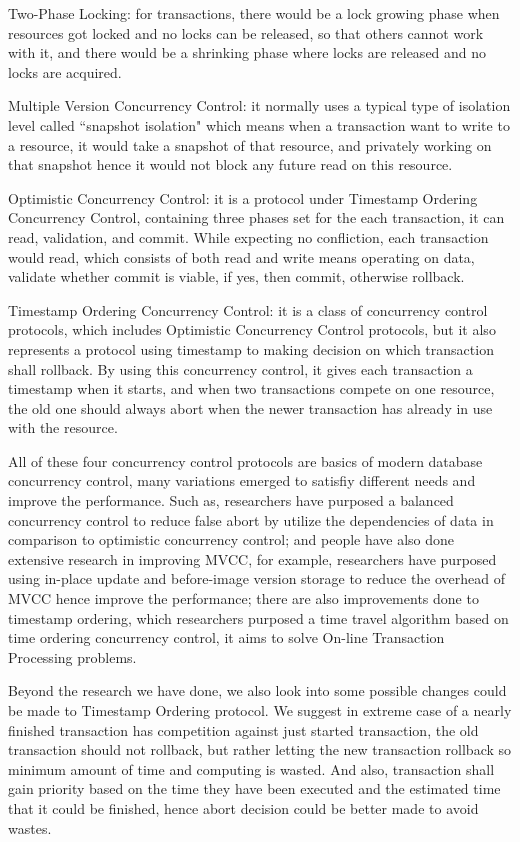 Two-Phase Locking: for transactions, there would be a lock growing phase when resources got locked and no locks can be released, so that others cannot work with it, and there would be a shrinking phase where locks are released and no locks are acquired.

Multiple Version Concurrency Control: it normally uses a typical type of isolation level called ``snapshot isolation" which means when a transaction want to write to a resource, it would take a snapshot of that resource, and privately working on that snapshot hence it would not block any future read on this resource\cite{berenson1995critique}.

Optimistic Concurrency Control: it is a protocol under Timestamp Ordering Concurrency Control, containing three phases set for the each transaction, it can read, validation, and commit. While expecting no confliction, each transaction would read, which consists of both read and write means operating on data, validate whether commit is viable, if yes, then commit, otherwise rollback.

Timestamp Ordering Concurrency Control: it is a class of concurrency control protocols, which includes Optimistic Concurrency Control protocols, but it also represents a protocol using timestamp to making decision on which transaction shall rollback. By using this concurrency control, it gives each transaction a timestamp when it starts, and when two transactions compete on one resource, the old one should always abort when the newer transaction has already in use with the resource.

All of these four concurrency control protocols are basics of modern database concurrency control, many variations emerged to satisfiy different needs and improve the performance. Such as, researchers have purposed a balanced concurrency control to reduce false abort by utilize the dependencies of data in comparison to optimistic concurrency control\cite{yuan2016bcc}; and people have also done extensive research in improving MVCC, for example, researchers have purposed using in-place update and before-image version storage to reduce the overhead of MVCC hence improve the performance\cite{neumann2015fast}; there are also improvements done to timestamp ordering, which researchers purposed a time travel algorithm based on time ordering concurrency control, it aims to solve On-line Transaction Processing problems\cite{yu2016tictoc}.

Beyond the research we have done, we also look into some possible changes could be made to Timestamp Ordering protocol. We suggest in extreme case of a nearly finished transaction has competition against just started transaction, the old transaction should not rollback, but rather letting the new transaction rollback so minimum amount of time and computing is wasted. And also, transaction shall gain priority based on the time they have been executed and the estimated time that it could be finished, hence abort decision could be better made to avoid wastes.

